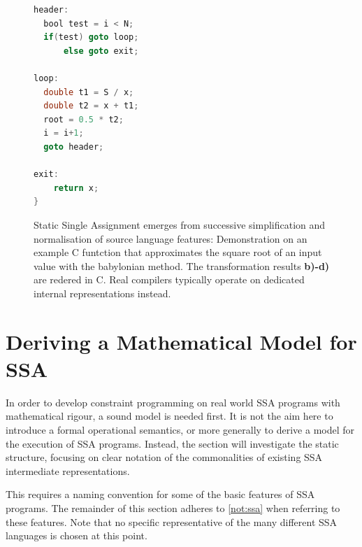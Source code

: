 \begin{figure}[p]
\begin{minipage}{0.48\textwidth}
\begin{lstlisting}[language=C,basicstyle=\linespread{1.06451612903}\ttfamily]
header:
  bool test = i < N;
  if(test) goto loop;
      else goto exit;

loop:
  double t1 = S / x;
  double t2 = x + t1;
  root = 0.5 * t2;
  i = i+1;
  goto header;

exit:
    return x;
}
    \end{lstlisting}
\end{minipage}

    \caption{Static Single Assignment emerges from successive simplification
             and normalisation of source language features: 
             Demonstration on an example C funtction that approximates the
             square root of an input value with the babylonian method.
             The transformation results {\bf b)-d)} are redered in C.
             Real compilers typically operate on
             dedicated internal representations instead.}
    \label{ssaexample}
\end{figure}

\pagebreak

\section{Deriving a Mathematical Model for SSA}

    In order to develop constraint programming on real world SSA programs with
    mathematical rigour, a sound model is needed first.
    It is not the aim here to introduce a formal operational semantics, or more
    generally to derive a model for the execution of SSA programs.
    Instead, the section will investigate the static structure, focusing on
    clear notation of the commonalities of existing SSA intermediate
    representations.

    This requires a naming convention for some of the basic features of
    SSA programs.
    The remainder of this section adheres to \autoref{not:ssa} when referring to
    these features.
    Note that no specific representative of the many different SSA languages is
    chosen at this point.


